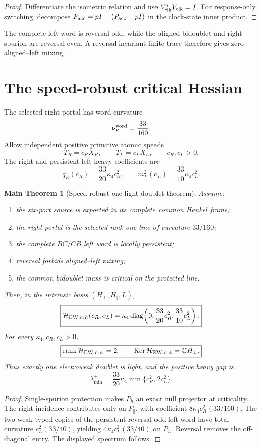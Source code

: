 \documentclass[11pt,oneside,openany]{book}
\numberwithin{equation}{chapter}
\newtheorem{maintheorem}[theorem]{Main Theorem}
\theoremstyle{definition}
\theoremstyle{remark}
\newcommand{\C}{\mathbb C}
\newcommand{\rank}{\operatorname{rank}}
\newcommand{\Ker}{\operatorname{Ker}}
\newcommand{\diag}{\operatorname{diag}}
\begin{document}
\begin{proof}
Differentiate the isometric relation and use \(V_{\rm clk}^*V_{\rm clk}=I\).
For response-only switching, decompose
\(P_{\rm acc}=pI+(P_{\rm acc}-pI)\) in the clock-state inner product.
\end{proof}

The complete left word is reversal odd, while the aligned bidoublet and right
spurion are reversal even.  A reversal-invariant finite trace therefore gives
zero aligned--left mixing.

\section{The speed-robust critical Hessian}
The selected right portal has word curvature
\[
 \nu_R^{\rm word}=\frac{33}{160}.
\]
Allow independent positive primitive atomic speeds
\[
 T_R=c_RX_R,
 \qquad
 T_L=c_LX_L,
 \qquad c_R,c_L>0.
\]
The right and persistent-left heavy coefficients are
\[
 q_R(c_R)=\frac{33}{20}\kappa_4c_R^2,
 \qquad
 m_L^2(c_L)=\frac{33}{10}\kappa_4c_L^2.
\]

\begin{maintheorem}[Speed-robust one-light-doublet theorem]
\label{thm:one-light-higgs}
Assume:
\begin{enumerate}[label=\textup{(H\arabic*)},leftmargin=2.8em]
\item the six-port source is exported in its complete common Hankel frame;
\item the right portal is the selected rank-one line of curvature \(33/160\);
\item the complete \(BC/CB\) left word is locally persistent;
\item reversal forbids aligned--left mixing;
\item the common bidoublet mass is critical on the protected line.
\end{enumerate}
Then, in the intrinsic basis
\((H_\perp,H_\parallel,L)\),
\[
 \boxed{
 \mathcal H_{\rm EW,crit}(c_R,c_L)
 =\kappa_4\diag\!\left(
 0,\frac{33}{20}c_R^2,\frac{33}{10}c_L^2
 \right).}
\]
For every \(\kappa_4,c_R,c_L>0\),
\[
 \boxed{
 \rank\mathcal H_{\rm EW,crit}=2,
 \qquad
 \Ker\mathcal H_{\rm EW,crit}=\C H_\perp.}
\]
Thus exactly one electroweak doublet is light, and the positive heavy gap is
\[
 \boxed{
 \lambda_{\min}^+
 =\frac{33}{20}\kappa_4\min\{c_R^2,2c_L^2\}.}
\]
\end{maintheorem}

\begin{proof}
Single-spurion protection makes \(P_h\) an exact null projector at
criticality.  The right incidence contributes only on \(P_\parallel\), with
coefficient \(8\kappa_4c_R^2(33/160)\).  The two weak typed copies of the
persistent reversal-odd left word have total curvature
\(c_L^2(33/40)\), yielding \(4\kappa_4c_L^2(33/40)\) on \(P_L\).  Reversal
removes the off-diagonal entry.  The displayed spectrum follows.
\end{proof}
\end{document}

